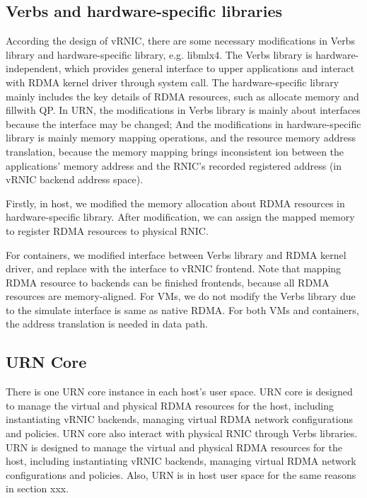 \subsection{Verbs and hardware-specific libraries}
According the design of vRNIC, there are some necessary modifications in Verbs library and hardware-specific library, e.g. libmlx4. The Verbs library is hardware-independent, which provides general interface to upper applications and interact with RDMA kernel driver through system call. The hardware-specific library mainly includes the key details of RDMA resources, such as allocate memory and fillwith QP. In URN, the modifications in Verbs library is mainly about interfaces because the interface may be changed; And the modifications in hardware-specific library is mainly memory mapping operations, and the resource memory address translation, because the memory mapping brings inconsistent ion between the applications' memory address and the RNIC's recorded registered address (in vRNIC backend address space).

Firstly, in host, we modified the memory allocation about RDMA resources in hardware-specific library. After modification, we can assign the mapped memory to register RDMA resources to physical RNIC.

For containers, we modified interface between Verbs library and RDMA kernel driver, and replace with the interface to vRNIC frontend. Note that mapping RDMA resource to backends can be finished frontends, because all RDMA resources are memory-aligned. For VMs, we do not modify the Verbs library due to the simulate interface is same as native RDMA. For both VMs and containers, the address translation is needed in data path.



\subsection{URN Core}
There is one URN core instance in each host's user space. URN core is designed to manage the virtual and physical RDMA resources for the host, including instantiating vRNIC backends, managing virtual RDMA network configurations and policies. URN core also interact with physical RNIC through Verbs libraries. 
URN is designed to manage the virtual and physical RDMA resources for the host, including instantiating vRNIC backends, managing virtual RDMA network configurations and policies. Also, URN is in host user space for the same reasons in section xxx.

